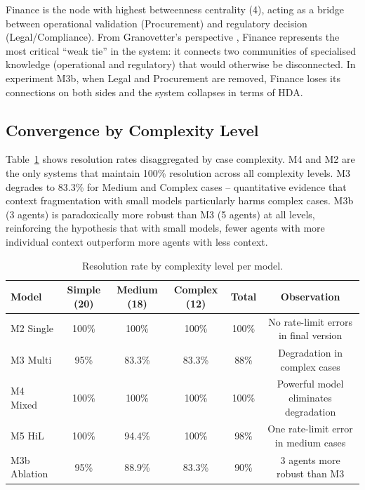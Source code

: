 \documentclass[preprint,12pt,authoryear]{elsarticle}
\begin{document}
Finance is the node with highest betweenness centrality (4), acting as a bridge
between operational validation (Procurement) and regulatory decision
(Legal/Compliance).
From Granovetter's perspective \citeyearpar{granovetter1973}, Finance represents
the most critical ``weak tie'' in the system: it connects two communities of
specialised knowledge (operational and regulatory) that would otherwise be
disconnected.
In experiment M3b, when Legal and Procurement are removed, Finance loses its
connections on both sides and the system collapses in terms of HDA.

\subsection{Convergence by Complexity Level}

Table~\ref{tab:complexity} shows resolution rates disaggregated by case
complexity.
M4 and M2 are the only systems that maintain 100\% resolution across all
complexity levels.
M3 degrades to 83.3\% for Medium and Complex cases -- quantitative evidence
that context fragmentation with small models particularly harms complex cases.
M3b (3 agents) is paradoxically more robust than M3 (5 agents) at all levels,
reinforcing the hypothesis that with small models, fewer agents with more
individual context outperform more agents with less context.

\begin{table}[htbp]
\centering
\caption{Resolution rate by complexity level per model.}
\label{tab:complexity}
\begin{tabular}{lccccc}
\toprule
\textbf{Model} & \textbf{Simple (20)} & \textbf{Medium (18)} &
  \textbf{Complex (12)} & \textbf{Total} & \textbf{Observation} \\
\midrule
M2 Single    & 100\% & 100\% & 100\% & 100\% & No rate-limit errors in final version \\
M3 Multi     & 95\%  & 83.3\% & 83.3\% & 88\% & Degradation in complex cases \\
M4 Mixed     & 100\% & 100\% & 100\% & 100\% & Powerful model eliminates degradation \\
M5 HiL       & 100\% & 94.4\% & 100\% & 98\% & One rate-limit error in medium cases \\
M3b Ablation & 95\%  & 88.9\% & 83.3\% & 90\% & 3 agents more robust than M3 \\
\bottomrule
\end{tabular}
\end{table}
\end{document}
